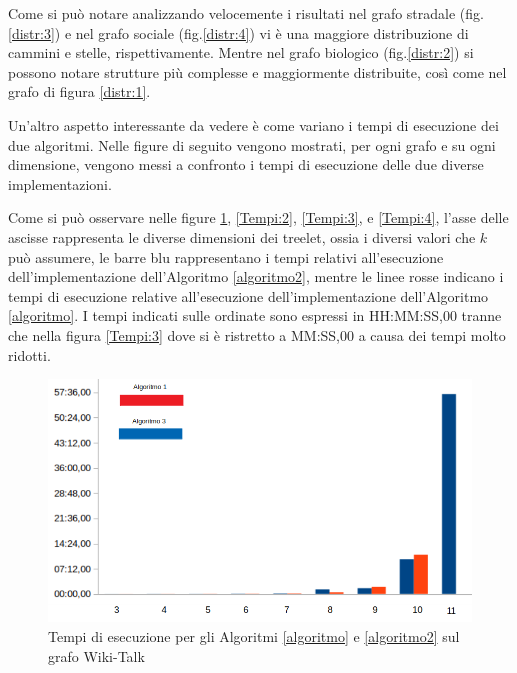 Come si può notare analizzando velocemente i risultati nel grafo stradale (fig.\ref{distr:3}) e nel grafo sociale (fig.\ref{distr:4}) vi è una maggiore distribuzione di cammini e stelle, rispettivamente.
Mentre nel grafo biologico (fig.\ref{distr:2}) si possono notare strutture più complesse e maggiormente distribuite, così come nel grafo di figura \ref{distr:1}.

Un'altro aspetto interessante da vedere è come variano i tempi di esecuzione dei due algoritmi.
Nelle figure di seguito vengono mostrati, per ogni grafo e su ogni dimensione,
vengono messi a confronto i tempi di esecuzione delle due diverse implementazioni.

Come si può osservare nelle figure \ref{Tempi:1}, \ref{Tempi:2}, \ref{Tempi:3}, e \ref{Tempi:4}, l'asse delle ascisse rappresenta le diverse dimensioni dei treelet, ossia i diversi valori che $ k $ può assumere, le barre blu rappresentano i tempi relativi all'esecuzione dell'implementazione dell'Algoritmo \ref{algoritmo2},
mentre le linee rosse indicano i tempi di esecuzione relative all'esecuzione dell'implementazione dell'Algoritmo \ref{algoritmo}.
I tempi indicati sulle ordinate sono espressi in HH:MM:SS,00 tranne che nella figura \ref{Tempi:3} dove si è ristretto a MM:SS,00 a causa dei tempi molto ridotti.
\begin{figure}[htbp]
	\includegraphics[width=15.4cm]{capitolo4/tempiWIKI}
	\caption{Tempi di esecuzione per gli Algoritmi \ref{algoritmo} e \ref{algoritmo2} sul grafo Wiki-Talk}
	\label{Tempi:1}
\end{figure}
